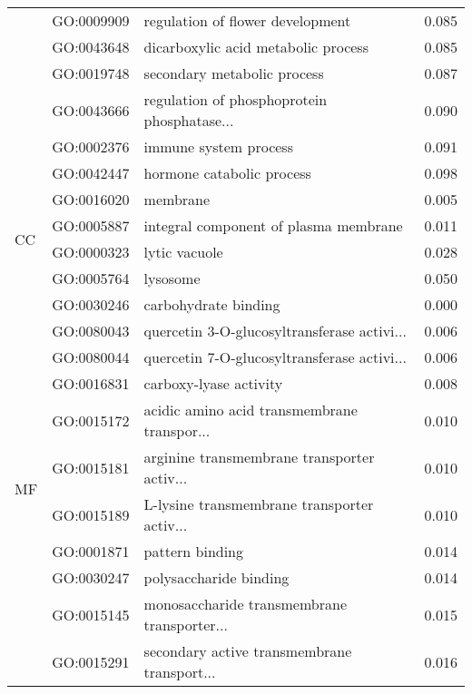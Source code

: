 \begin{longtable}{lllr}
   & GO:0009909 &             regulation of flower development &         0.085 \\
   & GO:0043648 &          dicarboxylic acid metabolic process &         0.085 \\
   & GO:0019748 &                  secondary metabolic process &         0.087 \\
   & GO:0043666 &  regulation of phosphoprotein phosphatase... &         0.090 \\
   & GO:0002376 &                        immune system process &         0.091 \\
   & GO:0042447 &                    hormone catabolic process &         0.098 \\
\cline{1-4}
\multirow{4}{*}{CC} & GO:0016020 &                                     membrane &         0.005 \\
   & GO:0005887 &        integral component of plasma membrane &         0.011 \\
   & GO:0000323 &                                lytic vacuole &         0.028 \\
   & GO:0005764 &                                     lysosome &         0.050 \\
\cline{1-4}
\multirow{27}{*}{MF} & GO:0030246 &                         carbohydrate binding &         0.000 \\
   & GO:0080043 &  quercetin 3-O-glucosyltransferase activi... &         0.006 \\
   & GO:0080044 &  quercetin 7-O-glucosyltransferase activi... &         0.006 \\
   & GO:0016831 &                       carboxy-lyase activity &         0.008 \\
   & GO:0015172 &  acidic amino acid transmembrane transpor... &         0.010 \\
   & GO:0015181 &  arginine transmembrane transporter activ... &         0.010 \\
   & GO:0015189 &  L-lysine transmembrane transporter activ... &         0.010 \\
   & GO:0001871 &                              pattern binding &         0.014 \\
   & GO:0030247 &                       polysaccharide binding &         0.014 \\
   & GO:0015145 &  monosaccharide transmembrane transporter... &         0.015 \\
   & GO:0015291 &  secondary active transmembrane transport... &         0.016 \\

\end{longtable}
